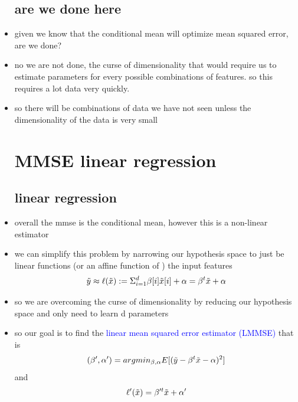\documentclass{article}
\begin{document}
\begin{itemize}
\subsection*{are we done here}
\item given we know that the conditional mean will optimize mean squared error, are we done?
\item no we are not done, the curse of dimensionality that would require us to estimate parameters for every possible
combinations of features. so this requires a lot data very quickly. 
\item so there will be combinations of data we have not seen unless the dimensionality of the data is very small 
\section{MMSE linear regression}
\subsection*{linear regression}
\item overall the mmse is the conditional mean, however this is a non-linear estimator
\item we can simplify this problem by narrowing our hypothesis space to just be linear functions (or an affine function of )
the input features $$\Tilde{y}\approx \ell (\Tilde{x}):=\Sigma_{i=1}^{d} \beta[i]\Tilde{x}[i]+\alpha=\beta^t\Tilde{x}+\alpha$$
\item so we are overcoming the curse of dimensionality by reducing our hypothesis space and only need to learn d parameters
\item so our goal is to find the \textcolor{blue}{linear mean squared error estimator (LMMSE)} that is 
$$(\beta' , \alpha')=argmin_{\beta , \alpha}E[(\Tilde{y}-\beta^t \Tilde{x}-\alpha)^2]$$ and $$\ell'(\Tilde{x})=\beta'^t\Tilde{x}+\alpha'$$ 

\end{itemize}
\end{document}
